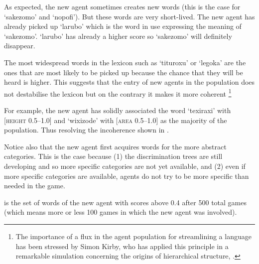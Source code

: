 As expected, the new 
agent sometimes creates new words (this is the case 
for `sakezomo' and `nopofi'). But these words are 
very short-lived. The new agent has already picked up 
`larubo' which is the word in use expressing the 
meaning of `sakezomo'. `larubo' has already a higher 
score so `sakezomo' will definitely disappear. 

The most widespread words in the lexicon 
such as `tituroxu' or `legoka' are the ones that 
are most likely to be picked up because the chance
that they will be heard is higher. This suggests
that the entry of new agents in the population does
not destabilise the lexicon but on the contrary 
it makes it more coherent \footnote{The importance of a flux in the agent population for
streamlining a language has been stressed by Simon Kirby, who 
has applied this principle in a remarkable simulation 
concerning the origins of hierarchical structure, \cite{Kirby:1999}.}

For example, the new agent
has solidly associated the word `texiraxi' with 
{}[\textsc{height} 0.5–1.0] and `wixizode' with [\textsc{area} 0.5–1.0]
as the majority of the population. Thus resolving the 
incoherence shown in . 

Notice also that the new agent first acquires words 
for the more abstract categories. This is the case 
because (1) the discrimination trees are still developing
and so more specific categories are not yet available, 
and (2) even if more specific categories are available, 
agents do not try to be more specific than needed in 
the game. 

 is the set of words of the new agent
with scores above 0.4 after 
500 total games (which means more or less 100 games 
in which the new agent was involved). 


